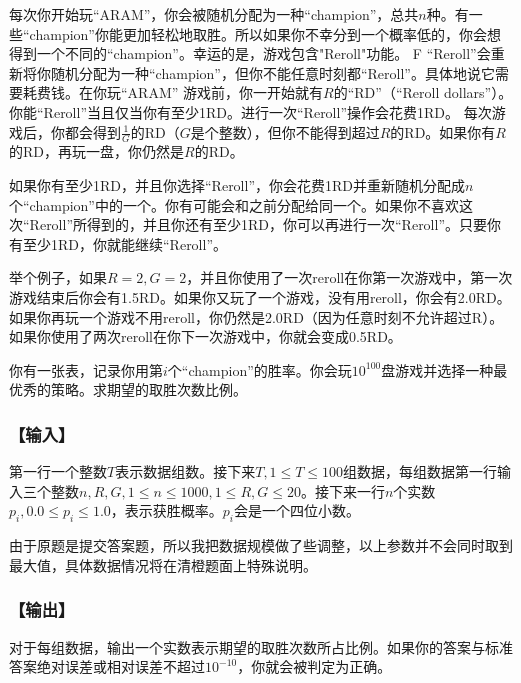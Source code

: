 \documentclass{ctexart}
\begin{document}
				每次你开始玩``ARAM''，你会被随机分配为一种``champion''，总共$n$种。有一些``champion''你能更加轻松地取胜。所以如果你不幸分到一个概率低的，你会想得到一个不同的``champion''。幸运的是，游戏包含"Reroll"功能。
F
				``Reroll''会重新将你随机分配为一种``champion''，但你不能任意时刻都``Reroll''。具体地说它需要耗费钱。在你玩``ARAM'' 游戏前，你一开始就有$R$的``RD''（``Reroll dollars''）。你能``Reroll''当且仅当你有至少1RD。进行一次``Reroll''操作会花费1RD。 每次游戏后，你都会得到$\frac{1}{G}$的RD（$G$是个整数），但你不能得到超过$R$的RD。如果你有$R$的RD，再玩一盘，你仍然是$R$的RD。

				如果你有至少1RD，并且你选择``Reroll''，你会花费1RD并重新随机分配成$n$个``champion''中的一个。你有可能会和之前分配给同一个。如果你不喜欢这次``Reroll''所得到的，并且你还有至少1RD，你可以再进行一次``Reroll''。只要你有至少1RD，你就能继续``Reroll''。

				举个例子，如果$R=2,G=2$，并且你使用了一次reroll在你第一次游戏中，第一次游戏结束后你会有1.5RD。如果你又玩了一个游戏，没有用reroll，你会有2.0RD。如果你再玩一个游戏不用reroll，你仍然是2.0RD（因为任意时刻不允许超过R）。如果你使用了两次reroll在你下一次游戏中，你就会变成0.5RD。

				你有一张表，记录你用第$i$个``champion''的胜率。你会玩$10^{100}$盘游戏并选择一种最优秀的策略。求期望的取胜次数比例。
			\subsubsection{【输入】}
				第一行一个整数$T$表示数据组数。接下来$T,1 \le T \le 100$组数据，每组数据第一行输入三个整数$n,R,G,1 \le n \le 1000,1 \le R,G \le 20$。接下来一行$n$个实数$p_i,0.0 \le p_i \le 1.0$，表示获胜概率。$p_i$会是一个四位小数。

				由于原题是提交答案题，所以我把数据规模做了些调整，以上参数并不会同时取到最大值，具体数据情况将在清橙题面上特殊说明。
			\subsubsection{【输出】}
				对于每组数据，输出一个实数表示期望的取胜次数所占比例。如果你的答案与标准答案绝对误差或相对误差不超过$10^{-10}$，你就会被判定为正确。
\end{document}
